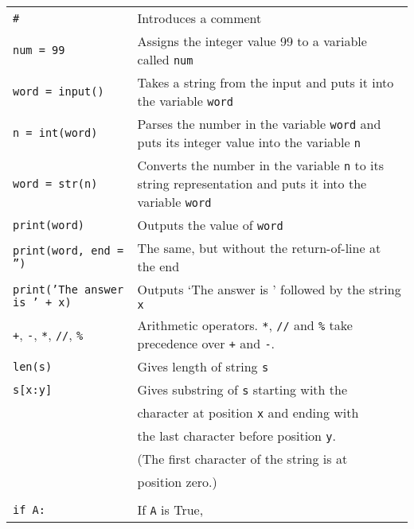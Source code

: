 
\begin{tabular}{p{6cm}p{7.2cm}}
\texttt{\#} & Introduces a comment\\
\texttt{num = 99} & Assigns the integer value 99 to a variable called \texttt{num}\\
\texttt{word = input()} & Takes a string from the input and puts it
into the variable \texttt{word} \\
\texttt{n = int(word)} & Parses the number in the variable
\texttt{word} and puts its integer value into the variable \texttt{n}
\\
\texttt{word = str(n)} & Converts the number in the variable
\texttt{n} to its string representation and puts it into the variable \texttt{word} \\
\texttt{print(word)} & Outputs the value of \texttt{word}\\
\texttt{print(word, end = '')} & The same, but without the return-of-line at the end\\
\texttt{print('The answer is ' + x)} & Outputs `The answer is ' followed by the string \texttt{x}\\
\texttt{+}, \texttt{-}, \texttt{*}, \texttt{//}, \texttt{\%} & Arithmetic operators.  \texttt{*}, \texttt{//} and \texttt{\%} take precedence over \texttt{+} and \texttt{-}.\\
\texttt{len(s)} & Gives length of string \texttt{s}\\
\texttt{s[x:y]} & Gives substring of \texttt{s} starting with the \\
                  & character at position \texttt{x} and ending with \\
                  & the last character before position \texttt{y}.\\
                  & (The first character of the string is at \\ 
                  & position zero.)\\
\\
\verb!if A:!    & If \texttt{A} is True,\\

\end{tabular}
